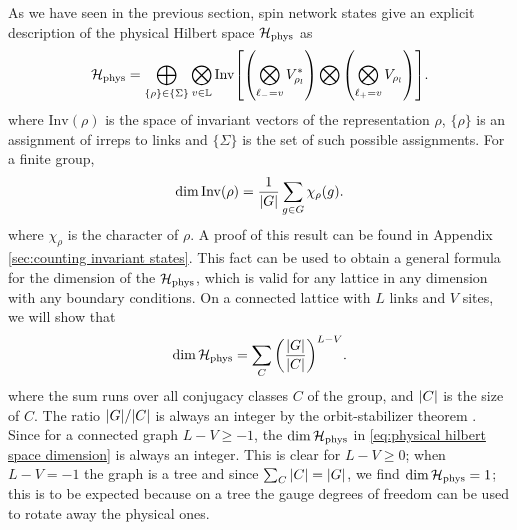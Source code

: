 As we have seen in the previous section, spin network states give an explicit description of the physical Hilbert space $\mathcal{H}_{\text{phys}}$ as
\begin{equation}
    \HilbertPhys =
    \bigoplus_{\{\rho\} \in \{\Sigma\}} \bigotimes_{v \in \Lattice}
    \mathrm{Inv}\bqty{
        \pqty{\bigotimes_{\link_{-} = v}  V_{\rho_l}^*} \bigotimes
        \pqty{\bigotimes_{\link_{+} = v}  V_{\rho_l}}
    }.
\end{equation}
where $\mathrm{Inv}(\rho)$ is the space of invariant vectors of the representation $\rho$, $\{\rho\}$ is an assignment of irreps to links and $\{\Sigma\}$ is the set of such possible assignments. For a finite group,
\begin{equation}
    \label{eq:invariant vectors counting}
    \dim{\mathrm{Inv}(\rho)} = \frac{1}{\abs{G}} \sum_{g \in G} \chi_\rho(g).
\end{equation}
where $\chi_\rho$ is the character of $\rho$. A proof of this result can be found in Appendix \ref{sec:counting invariant states}. This fact can be used to obtain a general formula for the dimension of the $\mathcal{H}_{\text{phys}}$, which is valid for any lattice in any dimension with any boundary conditions. On a connected lattice with $L$ links and $V$ sites, we will show that
\begin{equation}
    \label{eq:physical hilbert space dimension}
    \dim{\HilbertPhys} = \sum_C \pqty{\frac{\abs{G}}{\abs{C}}}^{L-V}.
\end{equation}
where the sum runs over all conjugacy classes $C$ of the group, and $\abs{C}$ is the size of $C$. The ratio $\abs{G}/\abs{C}$ is always an integer by the orbit-stabilizer theorem \cite{serre1967representations}.
Since for a connected graph $L-V \geq -1$, the $\dim{\mathcal{H}_{\text{phys}}}$ in \eqref{eq:physical hilbert space dimension} is always an integer.
This is clear for $L-V \geq 0$; when $L-V=-1$ the graph is a tree and since $\sum_C \abs{C}=\abs{G}$, we find $\dim{\mathcal{H}_{\text{phys}}}=1$; this is to be expected because on a tree the gauge degrees of freedom can be used to rotate away the physical ones.

